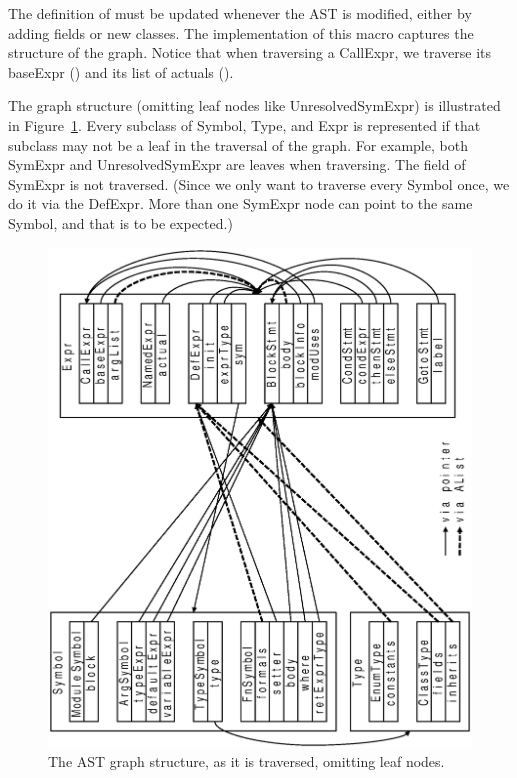\documentclass[10pt]{article}
\begin{document}
The definition of  must be updated whenever the
AST is modified, either by adding fields or new classes.  The
implementation of this macro captures the structure of the graph.
Notice that when traversing a CallExpr, we traverse its baseExpr
() and its list of actuals ().

The graph structure (omitting leaf nodes like UnresolvedSymExpr) is
illustrated in Figure~\ref{fig:ast}.  Every subclass of Symbol, Type,
and Expr is represented if that subclass may not be a leaf in the
traversal of the graph.  For example, both SymExpr and
UnresolvedSymExpr are leaves when traversing.  The  field of
SymExpr is not traversed.  (Since we only want to traverse every
Symbol once, we do it via the DefExpr.  More than one SymExpr node can
point to the same Symbol, and that is to be expected.)

\begin{figure}[htb]
\includegraphics[angle=270,scale=0.5]{AST.ps}
\caption{The AST graph structure, as it is traversed, omitting leaf nodes.}
\label{fig:ast}
\end{figure}
\end{document}
